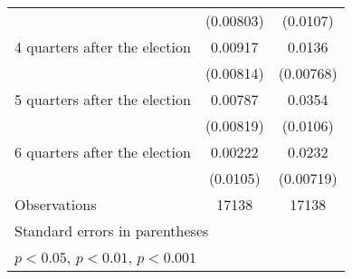 \begin{table}[htbp]
\begin{tabular}{l*{2}{c}}
                    &   (0.00803)         &    (0.0107)         \\
[1em]
 4 quarters after the election&     0.00917         &      0.0136         \\
                    &   (0.00814)         &   (0.00768)         \\
[1em]
 5 quarters after the election&     0.00787         &      0.0354\sym{***}\\
                    &   (0.00819)         &    (0.0106)         \\
[1em]
 6 quarters after the election&     0.00222         &      0.0232\sym{**} \\
                    &    (0.0105)         &   (0.00719)         \\
\hline
Observations        &       17138         &       17138         \\
\hline\hline
\multicolumn{3}{l}{\footnotesize Standard errors in parentheses}\\
\multicolumn{3}{l}{\footnotesize \sym{*} \(p<0.05\), \sym{**} \(p<0.01\), \sym{***} \(p<0.001\)}\\
\end{tabular}
\end{table}
